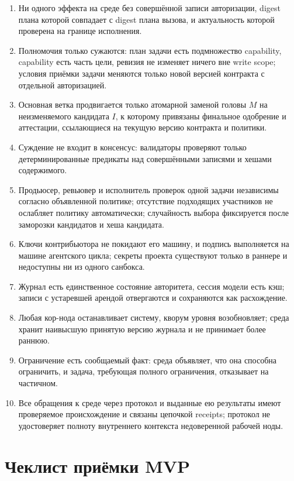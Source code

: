 \begin{enumerate}[label=I\arabic*.,leftmargin=2.6em,itemsep=3pt]
\item Ни одного эффекта на среде без совершённой записи авторизации, digest плана которой совпадает с digest плана вызова, и актуальность которой проверена на границе исполнения.
\item Полномочия только сужаются: план задачи есть подмножество capability, capability есть часть цели, ревизия не изменяет ничего вне write scope; условия приёмки задачи меняются только новой версией контракта с отдельной авторизацией.
\item Основная ветка продвигается только атомарной заменой головы $M$ на неизменяемого кандидата $I$, к которому привязаны финальное одобрение и аттестации, ссылающиеся на текущую версию контракта и политики.
\item Суждение не входит в консенсус: валидаторы проверяют только детерминированные предикаты над совершёнными записями и хешами содержимого.
\item Продьюсер, ревьювер и исполнитель проверок одной задачи независимы согласно объявленной политике; отсутствие подходящих участников не ослабляет политику автоматически; случайность выбора фиксируется после заморозки кандидатов и хеша кандидата.
\item Ключи контрибьютора не покидают его машину, и подпись выполняется на машине агентского цикла; секреты проекта существуют только в раннере и недоступны ни из одного санбокса.
\item Журнал есть единственное состояние авторитета, сессия модели есть кэш; записи с устаревшей арендой отвергаются и сохраняются как расхождение.
\item Любая кор-нода останавливает систему, кворум уровня возобновляет; среда хранит наивысшую принятую версию журнала и не принимает более раннюю.
\item Ограничение есть сообщаемый факт: среда объявляет, что она способна ограничить, и задача, требующая полного ограничения, отказывает на частичном.
\item Все обращения к среде через протокол и выданные ею результаты имеют проверяемое происхождение и связаны цепочкой receipts; протокол не удостоверяет полноту внутреннего контекста недоверенной рабочей ноды.
\end{enumerate}

\chapter{Чеклист приёмки MVP}

